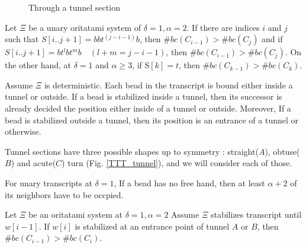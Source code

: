 \documentclass[runningheads]{llncs}
\begin{document}
\begin{figure}
\begin{center}
    \caption{Through a tunnel section}
    \label{TTT_tunnel_intro}
  \end{center}
\end{figure}




\begin{theorem}
Let $\Xi$ be a unary oritatami system of $\delta = 1, \alpha = 2$. If there are indices $i$ and $j$ such that $S[i..j+1] = bbt^{(j-i-1)}b$, then $\#bc(C_{i-1}) > \#bc(C_j)$ and if $S[i..j+1] = bt^lbt^mb \quad (l + m = j-i-1)$, then $\#bc(C_{i-1}) > \#bc(C_j)$. On the other hand, at $\delta = 1$ and $\alpha \geq 3$, if S$[k] = t$, then $\#bc(C_{k-1}) > \#bc(C_k)$.
\end{theorem}



\proof%
Assume $\Xi$ is deterministic.
Each bead in the transcript is bound either inside a tunnel or outside. If a bead is stabilized inside a tunnel, then its successor is already decided the position either inside of a tunnel or outside. Moreover, If a bead is stabilized outside a tunnel, then its position is an entrance of a tunnel or otherwise.

Tunnel sections have three possible shapes up to symmetry : straight($A$), obtuse($B$) and acute($C$) turn (Fig. \ref{TTT_tunnel}), and we will consider each of those. 

\begin{lemma}
\label{TTT_neighbor_lemma}
For unary transcripts at $\delta = 1$, If a bead has no free hand, then at least $\alpha + 2$ of its neighbors have to be occpied.
\end{lemma}

\begin{lemma}
\label{TTT_entrance_Tab}
Let $\Xi$ be an oritatami system at $\delta = 1, \alpha =2$ 
Assume $\Xi$ stabilizes transcript until $w[i-1]$. If $w[i]$ is stabilized at an entrance point of tunnel $A$ or $B$, then $\#bc(C_{i-1}) > \#bc(C_{i})$.
\end{lemma}
\end{document}

